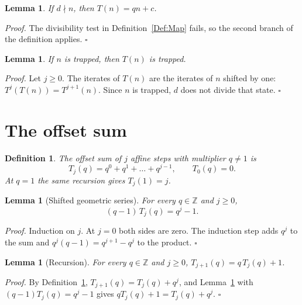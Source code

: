 \documentclass[11pt,letterpaper]{article}
\newcommand{\Z}{\mathbb{Z}}
\newtheorem{lemma}[theorem]{Lemma}
\newtheorem{definition}[theorem]{Definition}
\newenvironment{proof}{\noindent\textit{Proof.}}{\hfill\(\square\)}
\begin{document}
\begin{lemma}\label{Lem:Affine}
If \(d\nmid n\), then \(T(n)=qn+c\).
\end{lemma}

\begin{proof}
The divisibility test in Definition~\ref{Def:Map} fails, so the second branch
of the definition applies.
\end{proof}

\begin{lemma}\label{Lem:Preserved}
If \(n\) is trapped, then \(T(n)\) is trapped.
\end{lemma}

\begin{proof}
Let \(j\ge0\). The iterates of \(T(n)\) are the iterates of \(n\) shifted by
one: \(T^{j}(T(n))=T^{j+1}(n)\). Since \(n\) is trapped, \(d\) does not divide
that state.
\end{proof}

\section{The offset sum}

\begin{definition}\label{Def:Sum}
The offset sum of \(j\) affine steps with multiplier \(q\ne1\) is
\[
T_{j}(q)=q^{0}+q^{1}+\dots+q^{j-1},\qquad T_{0}(q)=0 .
\]
At \(q=1\) the same recursion gives \(T_{j}(1)=j\).
\end{definition}

\begin{lemma}[Shifted geometric series]\label{Lem:Series}
For every \(q\in\Z\) and \(j\ge0\),
\[
(q-1)\,T_{j}(q)=q^{j}-1 .
\]
\end{lemma}

\begin{proof}
Induction on \(j\). At \(j=0\) both sides are zero. The induction step adds
\(q^{j}\) to the sum and \(q^{j}(q-1)=q^{j+1}-q^{j}\) to the product.
\end{proof}

\begin{lemma}[Recursion]\label{Lem:Recursion}
For every \(q\in\Z\) and \(j\ge0\), \(T_{j+1}(q)=q\,T_{j}(q)+1\).
\end{lemma}

\begin{proof}
By Definition~\ref{Def:Sum}, \(T_{j+1}(q)=T_{j}(q)+q^{j}\), and
Lemma~\ref{Lem:Series} with \((q-1)T_{j}(q)=q^{j}-1\) gives
\(qT_{j}(q)+1=T_{j}(q)+q^{j}\).
\end{proof}
\end{document}
